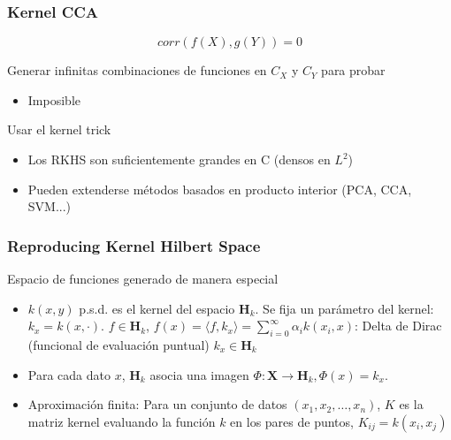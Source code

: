 \documentclass[t,9pt,pdftex]{beamer}
\begin{document}
\begin{frame}[c]
	\frametitle{Kernel CCA}
	$$corr(f(X), g(Y))=0$$
	\begin{block}{Generar infinitas combinaciones de funciones en $C_X$ y $C_Y$ para probar}
		\begin{itemize}
		\item Imposible
		\end{itemize}
	\end{block}	
	\begin{exampleblock}{Usar el kernel trick}
		\begin{itemize}
		\item Los RKHS son suficientemente grandes en C (densos en $L^2$)
		\item Pueden extenderse m\'etodos basados en producto interior (PCA, CCA, SVM...)
		\end{itemize}
	\end{exampleblock}
\end{frame}

\begin{frame}[c]
	\frametitle{Reproducing Kernel Hilbert Space}
	\begin{block}{Espacio de funciones generado de manera especial}
		\begin{itemize}
		\item $k(x,y)$ p.s.d. es el kernel del espacio $\mathbf{H}_k$. Se fija un par\'ametro del kernel: $k_x = k(x,\cdot)$. $f \in \mathbf{H}_k$, $f(x) = \langle f, k_x \rangle = \sum_{i=0}^{\infty}{\alpha_i k(x_i, x)}$: Delta de Dirac (funcional de evaluaci\'on puntual) $k_x \in \mathbf{H}_k$
		\item Para cada dato $x$, $\mathbf{H}_k$ asocia una imagen $\Phi: \mathbf{X} \rightarrow \mathbf{H}_k, \Phi(x) = k_x$.
		\item Aproximaci\'on finita: Para un conjunto de datos $(x_1, x_2, \ldots, x_n)$, $K$ es la matriz kernel evaluando la funci\'on $k$ en los pares de puntos, $K_{ij} = k(x_i,x_j)$
		\end{itemize}
	\end{block}
\end{frame}
\end{document}
